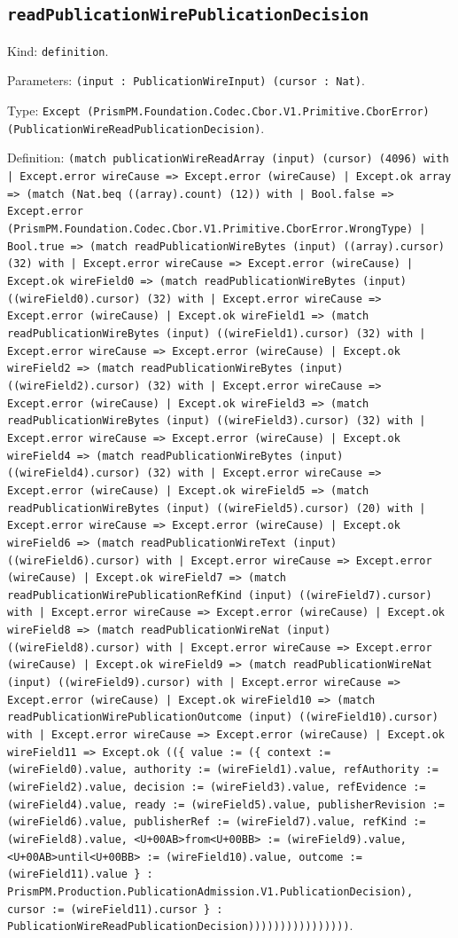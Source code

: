 \documentclass[11pt]{article}
\begin{document}
\subsection*{\texttt{readPublicationWirePublicationDecision}}
\noindent Kind: \texttt{definition}.\par
\noindent Parameters: \texttt{(input : PublicationWireInput) (cursor : Nat)}.\par
\noindent Type: \texttt{Except (PrismPM.Foundation.Codec.Cbor.V1.Primitive.CborError) (PublicationWireReadPublicationDecision)}.\par
\noindent Definition: \texttt{(match publicationWireReadArray (input) (cursor) (4096) with | Except.error wireCause => Except.error (wireCause) | Except.ok array => (match (Nat.beq ((array).count) (12)) with | Bool.false => Except.error (PrismPM.Foundation.Codec.Cbor.V1.Primitive.CborError.WrongType) | Bool.true => (match readPublicationWireBytes (input) ((array).cursor) (32) with | Except.error wireCause => Except.error (wireCause) | Except.ok wireField0 => (match readPublicationWireBytes (input) ((wireField0).cursor) (32) with | Except.error wireCause => Except.error (wireCause) | Except.ok wireField1 => (match readPublicationWireBytes (input) ((wireField1).cursor) (32) with | Except.error wireCause => Except.error (wireCause) | Except.ok wireField2 => (match readPublicationWireBytes (input) ((wireField2).cursor) (32) with | Except.error wireCause => Except.error (wireCause) | Except.ok wireField3 => (match readPublicationWireBytes (input) ((wireField3).cursor) (32) with | Except.error wireCause => Except.error (wireCause) | Except.ok wireField4 => (match readPublicationWireBytes (input) ((wireField4).cursor) (32) with | Except.error wireCause => Except.error (wireCause) | Except.ok wireField5 => (match readPublicationWireBytes (input) ((wireField5).cursor) (20) with | Except.error wireCause => Except.error (wireCause) | Except.ok wireField6 => (match readPublicationWireText (input) ((wireField6).cursor) with | Except.error wireCause => Except.error (wireCause) | Except.ok wireField7 => (match readPublicationWirePublicationRefKind (input) ((wireField7).cursor) with | Except.error wireCause => Except.error (wireCause) | Except.ok wireField8 => (match readPublicationWireNat (input) ((wireField8).cursor) with | Except.error wireCause => Except.error (wireCause) | Except.ok wireField9 => (match readPublicationWireNat (input) ((wireField9).cursor) with | Except.error wireCause => Except.error (wireCause) | Except.ok wireField10 => (match readPublicationWirePublicationOutcome (input) ((wireField10).cursor) with | Except.error wireCause => Except.error (wireCause) | Except.ok wireField11 => Except.ok ((\{ value := (\{ context := (wireField0).value, authority := (wireField1).value, refAuthority := (wireField2).value, decision := (wireField3).value, refEvidence := (wireField4).value, ready := (wireField5).value, publisherRevision := (wireField6).value, publisherRef := (wireField7).value, refKind := (wireField8).value, <U+00AB>from<U+00BB> := (wireField9).value, <U+00AB>until<U+00BB> := (wireField10).value, outcome := (wireField11).value \} : PrismPM.Production.PublicationAdmission.V1.PublicationDecision), cursor := (wireField11).cursor \} : PublicationWireReadPublicationDecision))))))))))))))))}.\par
\end{document}
